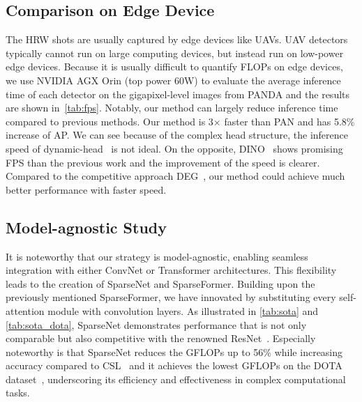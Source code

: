 \subsection{Comparison on Edge Device}
The HRW shots are usually captured by edge devices like UAVs. UAV detectors typically cannot run on large computing devices, but instead run on low-power edge devices. Because it is usually difficult to quantify FLOPs on edge devices, we use NVIDIA AGX Orin (top power 60W) to evaluate the average inference time of each detector on the gigapixel-level images from PANDA and the results are shown in~\cref{tab:fps}.
Notably, our method can largely reduce inference time compared to previous methods. Our method is 3$\times$ faster than PAN and has 5.8\% increase of AP.
We can see because of the complex head structure, the inference speed of dynamic-head~\cite{dai2021dynamic} is not ideal. 
On the opposite, DINO~\cite{zhang2022dino} shows promising FPS than the previous work and the improvement of the speed is clearer.
Compared to the competitive approach DEG~\cite{song2021dynamic},  our method could achieve much better performance with faster speed.


\subsection{Model-agnostic Study}
It is noteworthy that our strategy is model-agnostic, enabling seamless integration with either ConvNet or Transformer architectures. This flexibility leads to the creation of SparseNet and SparseFormer. Building upon the previously mentioned SparseFormer, we have innovated by substituting every self-attention module with convolution layers. As illustrated in \cref{tab:sota} and \cref{tab:sota_dota}, SparseNet demonstrates performance that is not only comparable but also competitive with the renowned ResNet~\cite{he2016deep}. Especially noteworthy is that SparseNet reduces the GFLOPs up to 56\% while increasing accuracy compared to CSL~\cite{yang2020arbitrary} and it achieves the lowest GFLOPs on the DOTA dataset~\cite{xia2018dota}, underscoring its efficiency and effectiveness in complex computational tasks.

